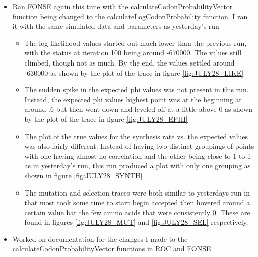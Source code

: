 \documentclass[11pt]{labbook}
\begin{document}
    \begin{itemize}
        \item Ran FONSE again this time with the calculateCodonProbabilityVector function being changed to the calculateLogCodonProbability function. I ran it with the same simulated data and parameters as yesterday's run
            \begin{itemize}
                \item The log likelihood values started out much lower than the previous run, with the status at iteration 100 being around -670000. The values still climbed, though not as much. By the end, the values settled around -630000 as shown by the plot of the trace in figure \ref{fig:JULY28_LIKE}
                \item The sudden spike in the expected phi values was not present in this run. Instead, the expected phi values highest point was at the beginning at around .6 but then went down and leveled off at a little above 0 as shown by the plot of the trace in figure \ref{fig:JULY28_EPHI}
                \item The plot of the true values for the synthesis rate vs. the expected values was also fairly different. Instead of having two distinct groupings of points with one having almost no correlation and the other being close to 1-to-1 as in yesterday's run, this run produced a plot with only one grouping as shown in figure \ref{fig:JULY28_SYNTH}
                \item The mutation and selection traces were both similar to yesterdays run in that most took some time to start begin accepted then hovered around a certain value bar the few amino acids that were consistently 0. These are found in figures \ref{fig:JULY28_MUT} and \ref{fig:JULY28_SEL} respectively.
            \end{itemize}
        \item Worked on documentation for the changes I made to the calculateCodonProbabilityVector functions in ROC and FONSE.
    \end{itemize}
    
\end{document}
